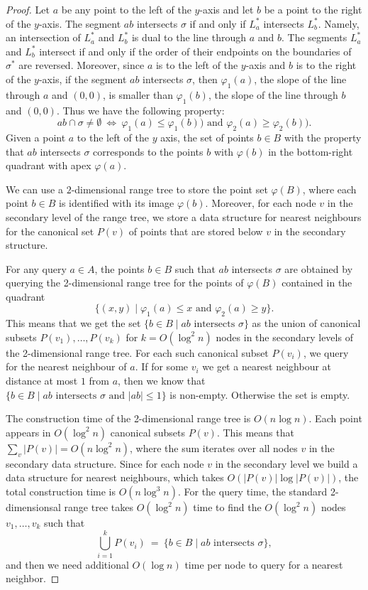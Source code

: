 \documentclass[a4paper,USenglish]{lipics}
\let\le\leqslant
\let\ge\geqslant
\begin{document}
\begin{proof}
	Let $a$ be any point to the left of the $y$-axis and 
	let $b$ be a point to the right of the $y$-axis.
	The segment $ab$ intersects $\sigma$ if and only if $L^*_a$ intersects $L^*_b$.
	Namely, an intersection of $L^*_a$ and $L^*_b$ is dual to the line
	through $a$ and $b$. The segments $L^*_a$ and $L^*_b$ intersect if
	and only if the order of their endpoints on the boundaries of $\sigma^*$ are reversed.
	Moreover, since $a$ is to the left of the $y$-axis and $b$ is to the right
	of the $y$-axis, if the segment $ab$ intersects $\sigma$,
    then $\varphi_1(a)$, the slope of the line through $a$ and $(0,0)$,
    is smaller than $\varphi_1(b)$, the slope of the line through $b$ and $(0,0)$.
	Thus we have the following property:
	\[
		ab \cap \sigma \neq \emptyset ~\Longleftrightarrow ~ 
		\varphi_1(a)\le \varphi_1(b)) \text{ and } \varphi_2(a)\ge \varphi_2(b)).
	\]			
	Given a point $a$ to the left of the $y$ axis, 
	the set of points $b\in B$ with the property
	that $ab$ intersects $\sigma$ corresponds to the points $b$ with $\varphi(b)$
	in the bottom-right quadrant with apex $\varphi(a)$. 	

	We can use a $2$-dimensional range tree to store the point set $\varphi(B)$,
	where each point $b\in B$ is identified with its image $\varphi(b)$. 
	Moreover, for each node $v$ in the secondary level of the range tree, we 
	store a data structure for nearest neighbours for the canonical set $P(v)$ of points
	that are stored below $v$ in the secondary structure.
	
	For any query $a\in A$, the points $b\in B$ such that $ab$ intersects
	$\sigma$ are obtained by querying the 2-dimensional range tree for the points
	of $\varphi(B)$ contained in the quadrant 
	\[
		\{(x,y)\mid  \varphi_1(a) \le x \text{ and } \varphi_2(a) \ge y\}.
	\]
	This means that we get the set
	$\{ b\in B \mid \text{$ab$ intersects $\sigma$}\}$
	as the union of canonical subsets 
	$P(v_1),\dots,P(v_k)$ for $k=O(\log^2 n)$ nodes in the secondary levels
	of the 2-dimensional range tree.
	For each such canonical subset $P(v_i)$, we query for the nearest neighbour of $a$.
	If for some $v_i$ we get a nearest neighbour at distance at most $1$ from $a$,
	then we know that $\{ b\in B \mid \text{$ab$ intersects $\sigma$ and $|ab|\le 1$}\}$
	is non-empty. Otherwise the set is empty.

	The construction time of the 2-dimensional range tree is $O(n\log n)$.
	Each point appears in $O(\log^2 n)$ canonical subsets $P(v)$.
	This means that $\sum_v |P(v)| = O( n\log^2 n)$, where the sum iterates over
	all nodes $v$ in the secondary data structure.
	Since for each node $v$ in the secondary level we build a data structure for
	nearest neighbours, which takes $O(|P(v)| \log |P(v)|)$,
	the total construction time is $O( n\log^3 n)$.
	For the query time, the standard 2-dimensionsal range tree takes
	$O(\log^2 n)$ time to find the $O(\log^2 n)$  nodes $v_1,\dots, v_k$ such
	that 
	\[
		\bigcup_{i=1}^k P(v_i) ~=~ \{ b\in B \mid \text{$ab$ intersects $\sigma$}\},
	\]
	and then we need additional $O(\log n)$ time per node to query for a nearest neighbor.


\end{proof}
\end{document}
